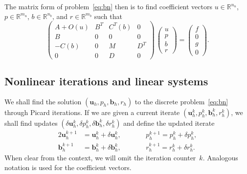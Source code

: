 \documentclass{siamltex}
\newcommand{\uu}[1]{\boldsymbol #1}                     %
\begin{document}
The matrix form of problem~\eqref{eq:bn} then is to find coefficient vectors $u\in\mathbb{R}^{n_u}$, $p\in\mathbb{R}^{m_u}$,  $b\in\mathbb{R}^{n_b}$, and $r\in\mathbb{R}^{m_b}$ such that
\begin{equation}
\label{eq:matrix-system}
\left(
\begin{array}{cccc}
A+O(u) & B^T & C^T(b) & 0\\
B & 0 & 0 & 0\\
-C(b) & 0 & M & D^T \\
0 & 0 & D & 0
\end{array}
\right)
\,
\left(
\begin{array}{c}
u\\
p\\
b\\
r
\end{array}
\right) =
\left(
\begin{array}{c} f\\0\\g\\0
\end{array}
\right).
\end{equation}

\subsection{Nonlinear iterations and linear systems}
\label{subsec:nonlinear_iteration}

We shall find the solution $(\uu{u}_h,
p_h,\uu{b}_h,r_h)$ to the discrete problem~\eqref{eq:bn} through Picard iterations.
If we are given a current iterate $(\uu{u}_h^k,p_h^k,\uu{b}_h^k,r_h^k)$, we shall find updates
$(\delta\uu{u}_h^k,\delta p_h^k,\delta\uu{b}_h^k,\delta r_h^k)$ and define the updated iterate
\begin{alignat*}2
\uu{u}_h^{k+1} &= \uu{u}_h^k+\delta\uu{u}_h^k,& \qquad &
p_h^{k+1} = p_h^k+\delta p_h^{k},\\
\uu{b}_h^{k+1}& =\uu{b}_h^k+\delta\uu{b}_h^k, & &  r_h^{k+1}=r_h^k+\delta r_h^k.
\end{alignat*}
When clear from the context, we will omit the iteration counter~$k$. Analogous notation is used
for the coefficient vectors.
\end{document}
